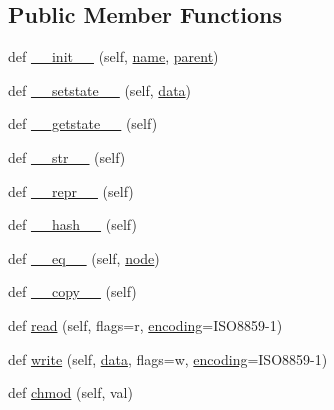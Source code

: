 \subsection*{Public Member Functions}
\begin{DoxyCompactItemize}
\item 
def \hyperlink{classwaflib_1_1_node_1_1_node_acf6238a6107f9c667ddd3aee5b30c626}{\+\_\+\+\_\+init\+\_\+\+\_\+} (self, \hyperlink{lib_2expat_8h_a1b49b495b59f9e73205b69ad1a2965b0}{name}, \hyperlink{classwaflib_1_1_node_1_1_node_a2136fddf4c5e98dc8d1661bee03e725c}{parent})
\item 
def \hyperlink{classwaflib_1_1_node_1_1_node_ae1ce2af534851b1b56bc257f486be757}{\+\_\+\+\_\+setstate\+\_\+\+\_\+} (self, \hyperlink{lib_2expat_8h_ac39e72a1de1cb50dbdc54b08d0432a24}{data})
\item 
def \hyperlink{classwaflib_1_1_node_1_1_node_a5f7b73ba50d8a67499518eacf1946689}{\+\_\+\+\_\+getstate\+\_\+\+\_\+} (self)
\item 
def \hyperlink{classwaflib_1_1_node_1_1_node_aea11f410459c73450de99bd614222100}{\+\_\+\+\_\+str\+\_\+\+\_\+} (self)
\item 
def \hyperlink{classwaflib_1_1_node_1_1_node_a312e0f3ae404d593e43dc8afd8965de9}{\+\_\+\+\_\+repr\+\_\+\+\_\+} (self)
\item 
def \hyperlink{classwaflib_1_1_node_1_1_node_ad2272ed88f10bb1e6e2f473ec38fa5a4}{\+\_\+\+\_\+hash\+\_\+\+\_\+} (self)
\item 
def \hyperlink{classwaflib_1_1_node_1_1_node_a2fce3a217e2e7ef6192cb2e5e0671a4c}{\+\_\+\+\_\+eq\+\_\+\+\_\+} (self, \hyperlink{structnode}{node})
\item 
def \hyperlink{classwaflib_1_1_node_1_1_node_ac6b216662a82357074bf7508a313ac06}{\+\_\+\+\_\+copy\+\_\+\+\_\+} (self)
\item 
def \hyperlink{classwaflib_1_1_node_1_1_node_a05c37e221931a32e74bd11e2dbb38431}{read} (self, flags=\textquotesingle{}r\textquotesingle{}, \hyperlink{structencoding}{encoding}=\textquotesingle{}I\+S\+O8859-\/1\textquotesingle{})
\item 
def \hyperlink{classwaflib_1_1_node_1_1_node_a3e2f255b6614d98ff3f73903cc1a0439}{write} (self, \hyperlink{lib_2expat_8h_ac39e72a1de1cb50dbdc54b08d0432a24}{data}, flags=\textquotesingle{}w\textquotesingle{}, \hyperlink{structencoding}{encoding}=\textquotesingle{}I\+S\+O8859-\/1\textquotesingle{})
\item 
def \hyperlink{classwaflib_1_1_node_1_1_node_a7c69c9ee890bc2113f4f44c8b6d0aed5}{chmod} (self, val)
\item 

\end{DoxyCompactItemize}
